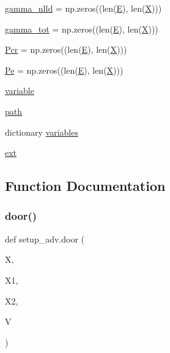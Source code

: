 \begin{DoxyCompactItemize}
\item 
\hyperlink{namespacesetup__adv_aebb51cf4468b9017ab51b2c90f1609cc}{gamma\+\_\+nlld} = np.\+zeros((len(\hyperlink{namespacesetup__adv_a5934fd9692b0afe75afd78fb1f301443}{E}), len(\hyperlink{namespacesetup__adv_a6d9cd2ec966fe51739f30fabc346a12b}{X})))
\item 
\hyperlink{namespacesetup__adv_ac0a5ebb1d693d1a582e1c26b26718b5c}{gamma\+\_\+tot} = np.\+zeros((len(\hyperlink{namespacesetup__adv_a5934fd9692b0afe75afd78fb1f301443}{E}), len(\hyperlink{namespacesetup__adv_a6d9cd2ec966fe51739f30fabc346a12b}{X})))
\item 
\hyperlink{namespacesetup__adv_afddd9ada89f75af836ebd16e781db55b}{Pcr} = np.\+zeros((len(\hyperlink{namespacesetup__adv_a5934fd9692b0afe75afd78fb1f301443}{E}), len(\hyperlink{namespacesetup__adv_a6d9cd2ec966fe51739f30fabc346a12b}{X})))
\item 
\hyperlink{namespacesetup__adv_a486a2dfb817b7794f6190ffcc8445496}{Pe} = np.\+zeros((len(\hyperlink{namespacesetup__adv_a5934fd9692b0afe75afd78fb1f301443}{E}), len(\hyperlink{namespacesetup__adv_a6d9cd2ec966fe51739f30fabc346a12b}{X})))
\item 
\hyperlink{namespacesetup__adv_a6d0baf11b1938f3a18333edc73c0123f}{variable}
\item 
\hyperlink{namespacesetup__adv_a3ac1f6538b0b6dacd3111eb75f4811d0}{path}
\item 
dictionary \hyperlink{namespacesetup__adv_a5aa2f642ac3119eb75b9a40bda824c20}{variables}
\item 
\hyperlink{namespacesetup__adv_aa5263a4dd6e33af764c6d7e87bd39590}{ext}
\end{DoxyCompactItemize}


\subsection{Function Documentation}
\mbox{\label{namespacesetup__adv_a38bed8824f69a250682029a7205ee046}} 
\subsubsection{\texorpdfstring{door()}{door()}}
{\footnotesize\ttfamily def setup\+\_\+adv.\+door (\begin{DoxyParamCaption}\item[{}]{X,  }\item[{}]{X1,  }\item[{}]{X2,  }\item[{}]{V }\end{DoxyParamCaption})}



